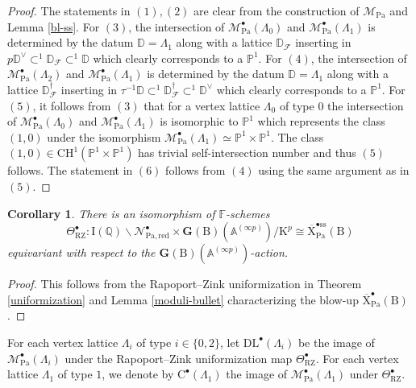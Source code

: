 \documentclass[10pt]{amsart}
\numberwithin{equation}{section}
\newtheorem{corollary}[equation]{Corollary}
\theoremstyle{definition}
\def\Pa{\mathrm{Pa}}
\def\calF{\mathcal{F}}
\def\calN{\mathcal{N}}
\def\calM{\mathcal{M}}
\def\AAA{\mathbb{A}}
\def\DD{\mathbb{D}}
\def\FF{\mathbb{F}}
\def\bfG{\mathbf{G}}
\def\PP{\mathbb{P}}
\def\QQ{\mathbb{Q}}
\def\rmB{\mathrm{B}}
\def\rmC{\mathrm{C}}
\def\rmI{\mathrm{I}}
\def\rmK{\mathrm{K}}
\def\rmX{\mathrm{X}}
\begin{document}
\begin{proof}
The statements in $(1), (2)$ are clear from the construction of $\calM_{\Pa}$ and Lemma \ref{bl-ss}. For $(3)$, the intersection of $\calM^{\bullet}_{\Pa}(\Lambda_{0})$ and $\calM^{\bullet}_{\Pa}(\Lambda_{1})$ is determined by the datum
$\DD=\Lambda_{1}$ along with a lattice $\DD_{\calF}$ inserting in $p\DD^{\vee}\subset^{1}\DD_{\calF}\subset^{1} \DD$ which clearly corresponds to a $\PP^{1}$. For $(4)$, the intersection of $\calM^{\bullet}_{\Pa}(\Lambda_{2})$ and $\calM^{\bullet}_{\Pa}(\Lambda_{1})$ is determined by the datum
$\DD=\Lambda_{1}$ along with a lattice $\DD^{\dagger}_{\calF}$ inserting in $\tau^{-1}\DD\subset^{1}\DD^{\dagger}_{\calF}\subset^{1} \DD^{\vee}$ which clearly corresponds to a $\PP^{1}$. For $(5)$, it follows from $(3)$ that for a vertex lattice $\Lambda_{0}$ of type $0$ the intersection of $\calM^{\bullet}_{\Pa}(\Lambda_{0})$ and $\calM^{\bullet}_{\Pa}(\Lambda_{1})$ is isomorphic to $\PP^{1}$ which represents the class $(1, 0)$ under the isomorphism $\calM^{\bullet}_{\Pa}(\Lambda_{1})\simeq \PP^{1}\times \PP^{1}$. The class $(1,0)\in \mathrm{CH}^{1}(\PP^{1}\times \PP^{1})$ has trivial self-intersection number and thus $(5)$ follows. The statement in $(6)$ follows from $(4)$ using the same argument as in $(5)$.
\end{proof}


\begin{corollary}\label{unifor-bullet}
There is an isomorphism of $\FF$-schemes
\begin{equation*}
\Theta^{\bullet}_{\mathrm{RZ}}:  \rmI(\QQ)\backslash {\calN}^{\bullet}_{\Pa, \mathrm{red}}\times  \bfG({\rmB})(\AAA^{(\infty p)})/\rmK^{p}\cong \overline{\rmX}^{\bullet\mathrm{ss}}_{\Pa}(\rmB)
\end{equation*}
equivariant with respect to the $\bfG({\rmB})(\AAA^{(\infty p)})$-action.
\end{corollary} 
\begin{proof}
This follows from the Rapoport--Zink uniformization in Theorem \ref{uniformization} and Lemma \ref{moduli-bullet} characterizing the blow-up $\overline{\rmX}^{\bullet}_{\Pa}(\rmB)$. 
\end{proof}

For each vertex lattice $\Lambda_{i}$ of type $i\in\{0,2\}$, let $\mathrm{DL}^{\bullet}(\Lambda_{i})$ be the image of $\calM^{\bullet}_{\Pa}(\Lambda_{i})$ under the Rapoport--Zink uniformization map $\Theta^{\bullet}_{\mathrm{RZ}}$.  For each vertex lattice $\Lambda_{1}$ of type $1$, we denote by $\rmC^{\bullet}(\Lambda_{1})$ the image of $\calM^{\bullet}_{\Pa}(\Lambda_{1})$ under $\Theta^{\bullet}_{\mathrm{RZ}}$.
\end{document}
